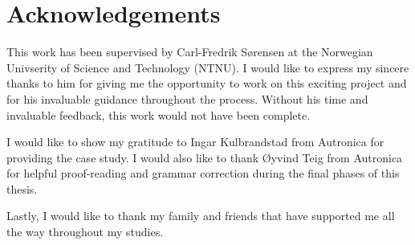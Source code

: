 \section*{\Huge Acknowledgements}
This work has been supervised by Carl-Fredrik Sørensen at the Norwegian Univserity of Science and Technology (NTNU). I would like to express my sincere thanks to him for giving me the opportunity to work on this exciting project and for his invaluable guidance throughout the process. Without his time and invaluable feedback, this work would not have been complete. 

I would like to show my gratitude to Ingar Kulbrandstad from Autronica for providing the case study. I would also like to thank Øyvind Teig from Autronica for helpful proof-reading and grammar correction during the final phases of this thesis. 

Lastly, I would like to thank my family and friends that have supported me all the way throughout my studies.

\cleardoublepage